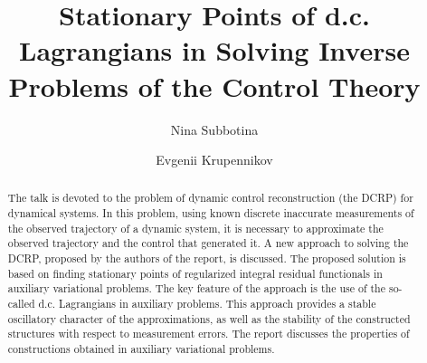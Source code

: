 \begin{englishtitle} %
\title{Stationary Points of d.c. Lagrangians in Solving Inverse Problems of
the Control Theory}
\author{Nina Subbotina 
  \and
  Evgenii Krupennikov 
}

\maketitle

\begin{abstract}
The talk is devoted to the problem of dynamic control reconstruction (the DCRP) for dynamical systems. In this problem, using known discrete inaccurate measurements of the observed trajectory of a dynamic system, it is necessary to approximate the observed trajectory and the control that generated it. A new approach to solving the DCRP, proposed by the authors of the report, is discussed. The proposed solution is based on finding stationary points of regularized integral residual functionals in auxiliary variational problems. The key feature of the approach is the use of the so-called d.c. Lagrangians in auxiliary problems. This approach provides a stable oscillatory character of the approximations, as well as the stability of the constructed structures with respect to measurement errors. The report discusses the properties of constructions obtained in auxiliary variational problems.

\end{abstract}
\end{englishtitle}

\iffalse

%
%

